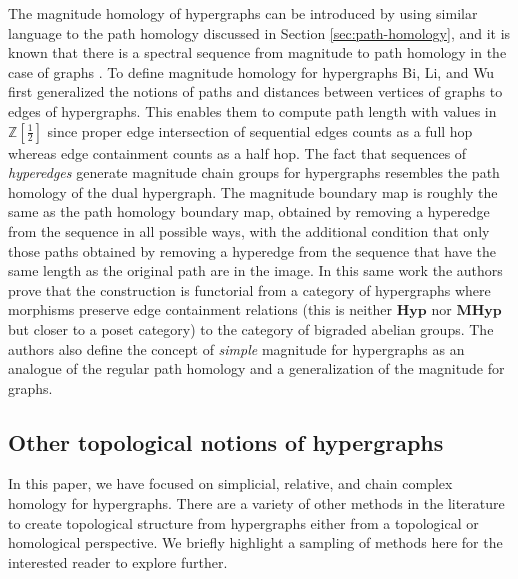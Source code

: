 \documentclass{amsart}
\newcommand{\Hyp}{\mathrm{\textbf{Hyp}}}
\newcommand{\MHyp}{\mathrm{\textbf{MHyp}}}
\begin{document}
The magnitude homology of hypergraphs can be introduced by using similar language to the path homology discussed in Section \ref{sec:path-homology}, and it is known that there is a spectral sequence from magnitude to path homology in the case of graphs \cite{asao2023magnitude}.  To define magnitude homology for hypergraphs Bi, Li, and Wu first generalized the notions of paths and distances between vertices of graphs to edges of hypergraphs. This enables them to compute path length with values in $\mathbb{Z}[\frac{1}{2}]$ since proper edge intersection of sequential edges counts as a full hop whereas edge containment counts as a half hop. 
The fact that sequences of \emph{hyperedges} generate magnitude chain groups for hypergraphs resembles the path homology of the dual hypergraph.  
The magnitude boundary map is roughly the same as the path homology boundary map, obtained by removing a hyperedge from the sequence in all possible ways, with the additional condition that only those paths obtained by removing a hyperedge  from the sequence that have the same length as the original path are in the image. In this same work the authors prove that the construction is functorial from a category of hypergraphs where morphisms preserve edge containment relations (this is neither $\Hyp$ nor $\MHyp$ but closer to a poset category) to the category of bigraded abelian groups.
The authors also define the concept of \emph{simple} magnitude for hypergraphs as an analogue of the regular path homology and a generalization of the magnitude for graphs. 


\subsection{Other topological notions of hypergraphs}
\label{sec:other}

In this paper, we have focused on simplicial, relative, and chain complex homology for hypergraphs. There are a variety of other methods in the literature to create topological structure from hypergraphs either from a topological or homological perspective. We briefly highlight a sampling of methods here for the interested reader to explore further. 
\end{document}
